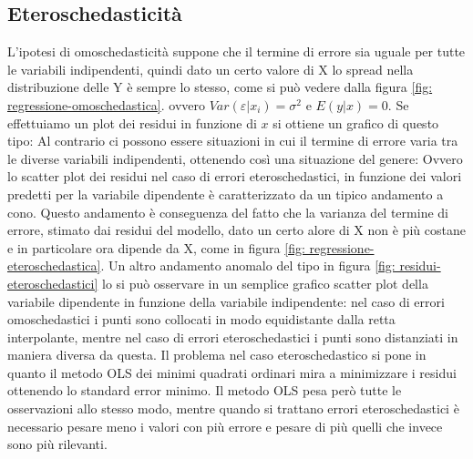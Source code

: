 \documentclass[]{article}
\begin{document}
\subsection{Eteroschedasticità}
L'ipotesi di omoschedasticità suppone che il termine di errore sia uguale per tutte le variabili indipendenti, quindi dato un certo valore di X lo spread nella distribuzione delle Y è sempre lo stesso, come si può vedere dalla figura \ref{fig: regressione-omoschedastica}.
ovvero $Var(\varepsilon \vert x_i) = \sigma^2$ e $E(y \vert x) = 0$. Se effettuiamo un plot dei residui in funzione di $x$ si ottiene un grafico di questo tipo:
Al contrario ci possono essere situazioni in cui il termine di errore varia tra le diverse variabili indipendenti, ottenendo così una situazione del genere:
Ovvero lo scatter plot dei residui nel caso di errori eteroschedastici, in funzione dei valori predetti per la variabile dipendente è caratterizzato da un tipico andamento a cono. Questo andamento è conseguenza del fatto che la varianza del termine di errore, stimato dai residui del modello, dato un certo alore di X non è più costane e in particolare ora dipende da X, come in figura \ref{fig: regressione-eteroschedastica}.
Un altro andamento anomalo del tipo in figura \ref{fig: residui-eteroschedastici} lo si può osservare in un semplice grafico scatter plot della variabile dipendente in funzione della variabile indipendente: nel caso di errori omoschedastici i punti sono collocati in modo equidistante dalla retta interpolante, mentre nel caso di errori eteroschedastici i punti sono distanziati in maniera diversa da questa. Il problema nel caso eteroschedastico si pone in quanto il metodo OLS dei minimi quadrati ordinari mira a minimizzare i residui ottenendo lo standard error minimo. Il metodo OLS pesa però tutte le osservazioni allo stesso modo, mentre quando si trattano errori eteroschedastici è necessario pesare meno i valori con più errore e pesare di più quelli che invece sono più rilevanti.\\
\end{document}

